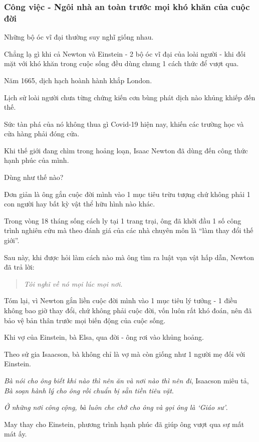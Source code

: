 \documentclass{article}
\begin{document}
\subsubsection{Công việc - Ngôi nhà an toàn trước mọi khó khăn của cuộc đời}
Những bộ óc vĩ đại thường suy nghĩ giống nhau.

Chẳng lạ gì khi cả Newton và Einstein - 2 bộ óc vĩ đại của loài người - khi đối mặt với khó khăn trong cuộc sống đều dùng chung 1 cách thức để vượt qua.

%
Năm 1665, dịch hạch hoành hành khắp London.

Lịch sử loài người chưa từng chứng kiến cơn bùng phát dịch nào khủng khiếp đến thế.

Sức tàn phá của nó không thua gì Covid-19 hiện nay, khiến các trường học và cửa hàng phải đóng cửa.

%
Khi thế giới đang chìm trong hoảng loạn, Isaac Newton đã dùng đến công thức hạnh phúc của mình.

Dùng như thế nào?

Đơn giản là ông gắn cuộc đời mình vào 1 mục tiêu trừu tượng chứ không phải 1 con người hay bất kỳ vật thể hữu hình nào khác.

Trong vòng 18 tháng sống cách ly tại 1 trang trại, ông đã khởi đầu 1 số công trình nghiên cứu mà theo đánh giá của các nhà chuyên môn là ``làm thay đổi thế giới''.

%
Sau này, khi được hỏi làm cách nào mà ông tìm ra luật vạn vật hấp dẫn, Newton đã trả lời:
\begin{quotation}
	\textit{Tôi nghĩ về nó mọi lúc mọi nơi}.
\end{quotation}
Tóm lại, vì Newton gắn liền cuộc đời mình vào 1 mục tiêu lý tưởng - 1 điều không bao giờ thay đổi, chứ không phải cuộc đời, vốn luôn rất khó đoán, nên đã bảo vệ bản thân trước mọi biến động của cuộc sống.

%
Khi vợ của Einstein, bà Elsa, qua đời - ông rơi vào khủng hoảng.

Theo sử gia Isaacson, bà không chỉ là vợ mà còn giống như 1 người mẹ đối với Einstein.

%
\textit{Bà nói cho ông biết khi nào thì nên ăn và nơi nào thì nên đi}, Isaacson miêu tả, \textit{Bà soạn hành lý cho ông rồi chuẩn bị sẵn tiền tiêu vặt}.

\textit{Ở những nơi công cộng, bà luôn che chở cho ông và gọi ông là `Giáo sư'}.

%
May thay cho Einstein, phương trình hạnh phúc đã giúp ông vượt qua sự mất mát ấy.
\end{document}
